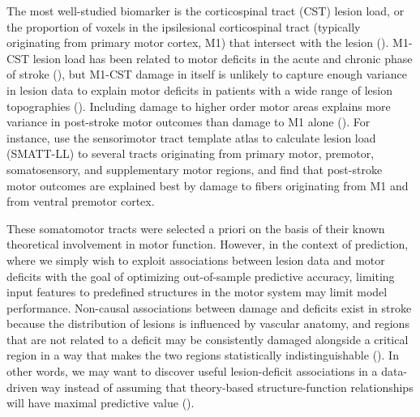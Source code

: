 \documentclass[phd,tocprelim]{cornell}
\begin{document}
The most well-studied biomarker is the corticospinal tract (CST) lesion load, or the proportion of voxels in the ipsilesional corticospinal tract (typically originating from primary motor cortex, M1) that intersect with the lesion (\cite{Zhu2010-qh, Feng2015-du, Findlater2019-je, Lam2018-xh, Pineiro2000-dv}). M1-CST lesion load has been related to motor deficits in the acute and chronic phase of stroke (\cite{Boyd2017-gs, Kim2017-xe}), but M1-CST damage in itself is unlikely to capture enough variance in lesion data to explain motor deficits in patients with a wide range of lesion topographies (\cite{Park2016-te,Findlater2019-je}). Including damage to higher order motor areas explains more variance in post-stroke motor outcomes than damage to M1 alone (\cite{Ito2022-em,  Rondina2016-ds, Rondina2017-ij, Schulz2012-yy, Park2016-te}). For instance, \cite{Ito2022-em} use the sensorimotor tract template atlas to calculate lesion load (SMATT-LL) to several tracts originating from primary motor, premotor, somatosensory, and supplementary motor regions, and find that post-stroke motor outcomes are explained best by damage to fibers originating from M1 and from ventral premotor cortex. 

These somatomotor tracts were selected a priori on the basis of their known theoretical involvement in motor function. However, in the context of prediction, where we simply wish to exploit associations between lesion data and motor deficits with the goal of optimizing out-of-sample predictive accuracy, limiting input features to predefined structures in the motor system may limit model performance. Non-causal associations between damage and deficits exist in stroke because the distribution of lesions is influenced by vascular anatomy, and regions that are not related to a deficit may be consistently damaged alongside a critical region in a way that makes the two regions statistically indistinguishable (\cite{Mah2014-cb}). In other words, we may want to discover useful lesion-deficit associations in a data-driven way instead of assuming that theory-based structure-function relationships will have maximal predictive value (\cite{Bzdok2020-py, Bonkhoff2022-op}).
\end{document}
